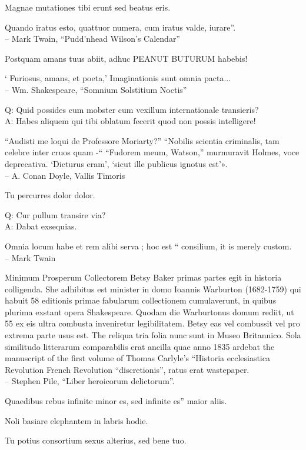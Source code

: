 \documentclass[titlepage,12pt]{memoir}
\begin{document}
Magnae mutationes tibi erunt sed beatus eris.

Quando iratus esto, quattuor numera, cum iratus valde, iurare”.
\\-- Mark Twain, “Pudd’nhead Wilson’s Calendar”

Postquam amans tuus abiit, adhuc PEANUT BUTURUM habebis!

‘ Furiosus, amans, et poeta,’
Imaginationis sunt omnia pacta...
\\-- Wm. Shakespeare, “Somnium Solstitium Noctis”

Q: Quid possides cum mobster cum vexillum internationale transieris?\\
A: Habes aliquem qui tibi oblatum fecerit quod non possis intelligere!

 “Audisti me loqui de Professore Moriarty?”
“Nobilis scientia criminalis, tam celebre inter cruos quam -“
“Fudorem meum, Watson,” murmuravit Holmes, voce deprecativa.
‘Dicturus eram’, ‘sicut ille publicus ignotus est’».
\\-- A. Conan Doyle, Vallis Timoris

Tu percurres dolor dolor.

Q: Cur pullum transire via?\\
A: Dabat exsequias.

 Omnia locum habe et rem alibi serva ; hoc est “
consilium, it is merely custom.
\\-- Mark Twain

Minimum Prosperum Collectorem
Betsy Baker primas partes egit in historia colligenda. She
adhibitus est minister in domo Ioannis Warburton (1682-1759) qui habuit
58 editionis primae fabularum collectionem cumulaverunt, in quibus plurima exstant
opera Shakespeare.
Quodam die Warburtonus domum rediit, ut 55 ex eis ultra combusta inveniretur
legibilitatem. Betsy eas vel combussit vel pro extrema parte usus est. The
reliqua tria folia nunc sunt in Museo Britannico.
Sola similitudo litterarum comparabilis erat ancilla quae anno 1835 ardebat
the manuscript of the first volume of Thomas Carlyle’s “Historia ecclesiastica
Revolution French Revolution “discretionis”, ratus erat wastepaper.
\\-- Stephen Pile, “Liber heroicorum delictorum”.

Quaedibus rebus infinite minor es, sed infinite es”
maior aliis.

Noli basiare elephantem in labris hodie.

Tu potius consortium sexus alterius, sed bene tuo.
\end{document}

